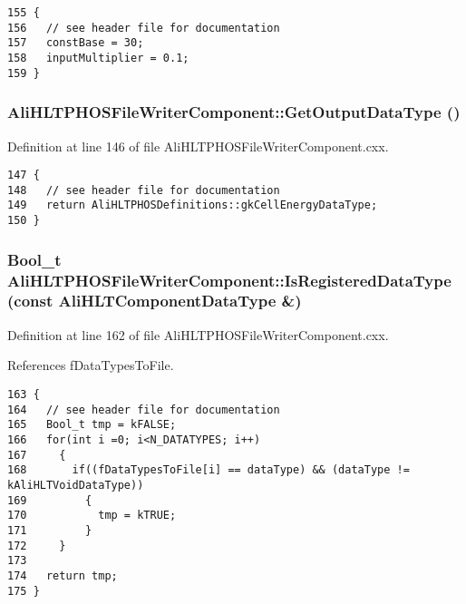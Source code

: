 \footnotesize\begin{verbatim}155 {
156   // see header file for documentation
157   constBase = 30;
158   inputMultiplier = 0.1;
159 }
\end{verbatim}\normalsize 


\subsubsection{ Ali\-HLTPHOSFile\-Writer\-Component::Get\-Output\-Data\-Type ()\hspace{0.3cm}{\tt  [virtual]}}\label{classAliHLTPHOSFileWriterComponent_a7}




Definition at line 146 of file Ali\-HLTPHOSFile\-Writer\-Component.cxx.

\footnotesize\begin{verbatim}147 {
148   // see header file for documentation
149   return AliHLTPHOSDefinitions::gkCellEnergyDataType;
150 }
\end{verbatim}\normalsize 


\subsubsection{\setlength{\rightskip}{0pt plus 5cm}Bool\_\-t Ali\-HLTPHOSFile\-Writer\-Component::Is\-Registered\-Data\-Type (const {\bf Ali\-HLTComponent\-Data\-Type} \&)\hspace{0.3cm}{\tt  [private]}}\label{classAliHLTPHOSFileWriterComponent_d0}




Definition at line 162 of file Ali\-HLTPHOSFile\-Writer\-Component.cxx.

References f\-Data\-Types\-To\-File.

\footnotesize\begin{verbatim}163 {
164   // see header file for documentation
165   Bool_t tmp = kFALSE;
166   for(int i =0; i<N_DATATYPES; i++)
167     {
168       if((fDataTypesToFile[i] == dataType) && (dataType !=  kAliHLTVoidDataType))
169         {
170           tmp = kTRUE;
171         }
172     }
173 
174   return tmp;
175 }
\end{verbatim}\normalsize 



